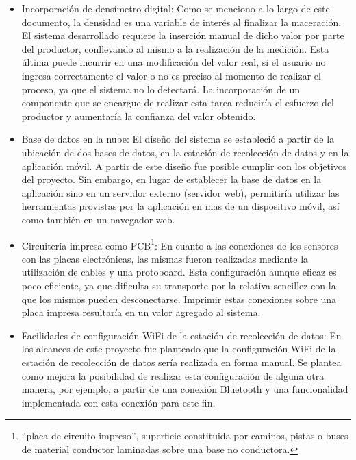 \begin{itemize}
    \item Incorporación de densímetro digital: Como se menciono a lo largo de este documento, la densidad es una variable de interés al finalizar la maceración. El sistema desarrollado requiere la inserción manual de dicho valor por parte del productor, conllevando al mismo a la realización de la medición. Esta última puede incurrir en una modificación del valor real, si el usuario no ingresa correctamente el valor o no es preciso al momento de realizar el proceso, ya que el sistema no lo detectará. La incorporación de un componente que se encargue de realizar esta tarea reduciría el esfuerzo del productor y aumentaría la confianza del valor obtenido. 
    
    \item Base de datos en la nube: El diseño del sistema se estableció a partir de la ubicación de dos bases de datos, en la estación de recolección de datos y en la aplicación móvil. A partir de este diseño fue posible cumplir con los objetivos del proyecto. Sin embargo, en lugar de establecer la base de datos en la aplicación sino en un servidor externo (servidor web), permitiría utilizar las herramientas provistas por la aplicación en mas de un dispositivo móvil, así como también en un navegador web.
    
    \item Circuitería impresa como PCB\footnote{“placa de circuito impreso”, superficie constituida por caminos, pistas o buses de material conductor laminadas sobre una base no conductora.}: En cuanto a las conexiones de los sensores con las placas electrónicas, las mismas fueron realizadas mediante la utilización de cables y una protoboard. Esta configuración aunque eficaz es poco eficiente, ya que dificulta su transporte por la relativa sencillez con la que los mismos pueden desconectarse. Imprimir estas conexiones sobre una placa impresa resultaría en un valor agregado al sistema.
    
    \item Facilidades de configuración WiFi\textsuperscript{\textregistered} de la estación de recolección de datos: En los alcances de este proyecto fue planteado que la configuración WiFi\textsuperscript{\textregistered} de la estación de recolección de datos sería realizada en forma manual. Se plantea como mejora la posibilidad de realizar esta configuración de alguna otra manera, por ejemplo, a partir de una conexión Bluetooth\textsuperscript{\textregistered} y una funcionalidad implementada con esta conexión para este fin.
    

\end{itemize}
